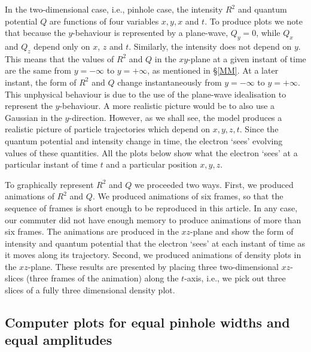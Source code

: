 \documentclass[12pt]{article}       %
\begin{document}
In the two-dimensional case,  i.e., pinhole case,   the intensity $R^2$ and quantum potential $Q$ are functions of four variables $x,y,x$ and $t$. To produce plots we note that because the $y$-behaviour is represented by a plane-wave, $Q_y=0$, while $Q_x$ and $Q_z$ depend only on $x$, $z$ and $t$. Similarly, the intensity does not depend on $y$. This means that the values of $R^2$ and $Q$ in the  $xy$-plane at a given instant of time are the same from $y=-\infty$ to $y=+\infty$, as mentioned in \S \ref{MM}. At a later instant, the form of  $R^2$ and $Q$ change instantaneously from $y=-\infty$ to $y=+\infty$. This unphysical behaviour is due  to the use of the plane-wave idealisation to represent  the $y$-behaviour. A more realistic picture would be to also use a Gaussian  in the $y$-direction. However, as we shall see, the model produces a realistic picture of particle trajectories which depend on $x,y,z,t$.  Since the quantum potential and intensity change in time, the electron  `sees' evolving values of these quantities. All the plots below show what the electron `sees' at a particular instant of time $t$ and a particular position $x,y,z$.

To graphically represent $R^2$ and $Q$ we proceeded two ways. First, we produced animations of $R^2$ and $Q$.  We produced animations of six frames, so that the sequence of frames is short enough to be reproduced in this article. In any case,  our commuter did not have enough memory to produce animations of more than six frames. The animations are produced in the $xz$-plane and show the form of intensity and quantum potential that the electron `sees' at each instant of time as it moves along its trajectory. Second, we produced animations of density plots in the $xz$-plane. These results are presented  by  placing three two-dimensional  $xz$-slices (three frames of the animation) along the $t$-axis, i.e., we pick out three slices of a fully three dimensional density plot. 

\subsection{Computer plots for equal pinhole widths and equal amplitudes}
\end{document}
